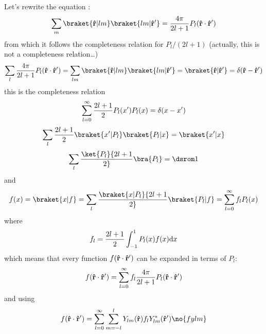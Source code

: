 Let's rewrite the equation :
$$\sum_m\braket{{\bf\hat r}|lm}\braket{lm|{\bf\hat r'}}=
{4\pi\over 2l+1} P_l({\bf\hat r}\cdot{\bf\hat r'})$$
from which it follows the completeness relation for $P_l/(2l+1)$ (actually,
this is not a completeness relation\dots)
$$\sum_l{4\pi\over 2l+1} P_l({\bf\hat r}\cdot{\bf\hat r'})=
\sum_{lm}\braket{{\bf\hat r}|lm}\braket{lm|{\bf\hat r'}}=
\braket{{\bf\hat r}|{\bf\hat r'}}=\delta({\bf\hat r}-{\bf\hat r'})
$$
this is the completeness relation
$$\sum_{l=0}^\infty {2l+1\over2}P_l(x')P_l(x)=\delta(x-x')$$
$$\sum_l {2l+1\over2}\braket{x'|P_l}\braket{P_l|x}=\braket{x'|x}$$
$$\sum_l \ket{P_l}{2l+1\over2}\bra{P_l}=\one$$
and
$$f(x)=\braket{x|f}=\sum_l\braket{x|P_l}{2l+1\over2}\braket{P_l|f}=
\sum_{l=0}^\infty f_l P_l(x)$$
where
$$f_l={2l+1\over2}\int_{-1}^1 P_l(x)f(x){\rm d} x$$
which means that every function $f({\bf\hat r}\cdot{\bf\hat r'})$ 
can be expanded in terms of $P_l$:
$$f({\bf\hat r}\cdot{\bf\hat r'})=\sum_{l=0}^\infty f_l 
{4\pi\over 2l+1} P_l({\bf\hat r}\cdot{\bf\hat r'})$$
and using 
$$f({\bf\hat r}\cdot{\bf\hat r'})=
\sum_{l=0}^\infty\sum_{m=-l}^l Y_{lm}({\bf\hat r}) f_l Y_{lm}^*({\bf\hat r'})
\no{fylm}
$$
